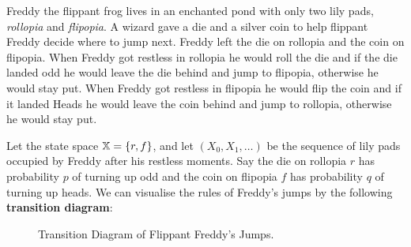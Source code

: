 \begin{example}\label{EX:FlippantFreddy}
Freddy the flippant frog lives in an enchanted pond with only two lily pads, {\em rollopia} and {\em flipopia}.  A wizard gave a  die and a silver coin to help flippant Freddy decide where to jump next.  Freddy left the die on rollopia and the coin on flipopia.  When Freddy got restless in rollopia he would roll the die and if the die landed odd he would leave the die behind and jump to flipopia, otherwise he would stay put.  When Freddy got restless in flipopia he would flip the coin and if it landed Heads he would leave the coin behind and jump to rollopia, otherwise he would stay put.

Let the state space $\mathbb{X}=\{r,f\}$, and let $(X_0, X_1,\ldots)$ be the sequence of lily pads occupied by Freddy after his restless moments.  Say the die on rollopia $r$ has probability $p$ of turning up odd and the coin on flipopia $f$ has probability $q$ of turning up heads.  We can visualise the rules of Freddy's jumps by the following {\bf transition diagram}:
\begin{figure}[htpb]
\caption{Transition Diagram of Flippant Freddy's Jumps.\label{F:FlippantFreddyTransDiag}}
\centering   {}
\end{figure}


\end{example}
